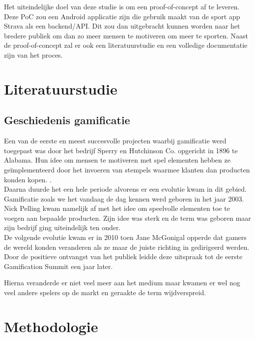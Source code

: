 Het uiteindelijke doel van deze studie is om een proof-of-concept af te leveren. Deze PoC zou een Android applicatie zijn die gebruik maakt van de sport app Strava als een backend/API. Dit zou dan uitgebracht kunnen worden naar het bredere publiek om dan zo meer mensen te motiveren om meer te sporten. Naast de proof-of-concept zal er ook een literatuurstudie en een volledige documentatie zijn van het proces.


\section{Literatuurstudie}%
\label{sec:state-of-the-art}

\subsection{Geschiedenis gamificatie}

Een van de eerste en meest succesvolle projecten waarbij gamificatie werd toegepast was door het bedrijf Sperry en Hutchinson Co. opgericht in 1896 te Alabama. Hun idee om mensen te motiveren met spel elementen hebben ze geïmplementeerd door het invoeren van stempels waarmee klanten dan producten konden kopen. \autocite{Christians2018}. \\

Daarna duurde het een hele periode alvorens er een evolutie kwam in dit gebied. Gamificatie zoals we het vandaag de dag kennen werd geboren in het jaar 2003. Nick Pelling kwam namelijk af met het idee om speelvolle elementen toe te voegen aan bepaalde producten. Zijn idee was sterk en de term was geboren maar zijn bedrijf ging uiteindelijk ten onder. \autocite{Khaitova2021} \\

De volgende evolutie kwam er in 2010 toen Jane McGonigal opperde dat gamers de wereld konden veranderen als ze maar de juiste richting in gedirigeerd werden. Door de positieve ontvangst van het publiek leidde deze uitspraak tot de eerste Gamification Summit een jaar later. \autocite{Christians2018}

Hierna veranderde er niet veel meer aan het medium maar kwamen er wel nog veel andere spelers op de markt en geraakte de term wijdverspreid.




\section{Methodologie}%
\label{sec:methodologie}

